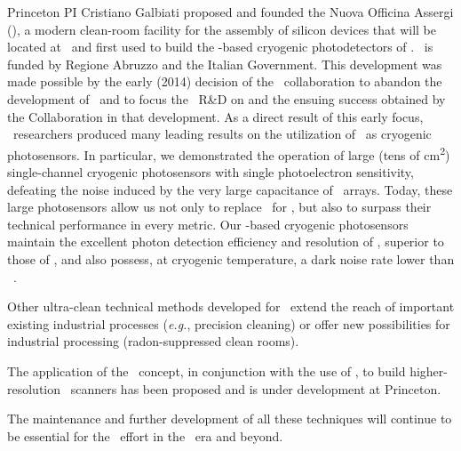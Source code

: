 \begin{compactitem}
\item Princeton PI Cristiano Galbiati proposed and founded the Nuova Officina Assergi (\NOA), a modern clean-room facility for the assembly of silicon devices that will be located at \LNGS\ and first used to build the \SiPM-based cryogenic photodetectors of \DSks.  \NOA\ is funded by Regione Abruzzo and the Italian Government.  This development was made possible by the early (2014) decision of the \GADMC\ collaboration to abandon the development of \PMTs\ and to focus the \DSs\ R\&D on \SiPMs and the ensuing success obtained by the Collaboration in that development.  As a direct result of this early focus, \DSs\ researchers produced many leading results on the utilization of \SiPMs\ as cryogenic photosensors.  In particular, we demonstrated the operation of large (tens of \si{\square\cm}) single-channel cryogenic photosensors with single photoelectron sensitivity, defeating the noise induced by the very large capacitance of \SiPMs\ arrays.  Today, these large photosensors allow us not only to replace \PMTs\ for \DSks, but also to surpass their technical performance in every metric.  Our \SiPM-based cryogenic photosensors maintain the excellent photon detection efficiency and resolution of \SiPMs, superior to those of \PMTs, and also possess, at cryogenic temperature, a dark noise rate lower than \PMTs~\cite{DIncecco:2018hy}.

\item Other ultra-clean technical methods developed for \DSfs\ extend the reach of important existing industrial processes ({\it e.g.}, precision cleaning) or offer new possibilities for industrial processing (radon-suppressed clean rooms).

\item The application of the \LArTPC\ concept, in conjunction with the use of \SiPMs, to build higher-resolution \PET\ scanners has been proposed and is under development at Princeton.

\end{compactitem}

The maintenance and further development of all these techniques will continue to be essential for the \GADMC\ effort in the \DSks\ era and beyond.